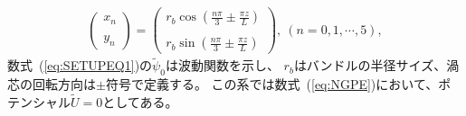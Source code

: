 \documentclass[12pt,a4paper]{jbook}
\begin{document}
			\begin{eqnarray}
				\label{eq:SETUPEQ2}
				\left(
					\begin{array}{l}
						x_n
						\\
						\\
						y_n
					\end{array}
				\right) =
				\left(
					\begin{array}{l}
						r_b \cos \left( \frac{n \pi}{3} \pm \frac{\pi z}{L} \right)
						\\
						\\
						r_b \sin \left( \frac{n \pi}{3} \pm \frac{\pi z}{L} \right)
					\end{array}
				\right), \ (n=0, 1, \cdots, 5),
			\end{eqnarray}
			数式~(\ref{eq:SETUPEQ1})の$\tilde{\psi}_0$は波動関数を示し、
			$r_b$はバンドルの半径サイズ、渦芯の回転方向は$\pm$符号で定義する。
			この系では数式~(\ref{eq:NGPE})において、ポテンシャル$\tilde{U}=0$としてある。
        

\end{document}
